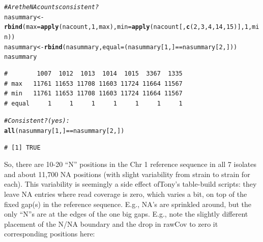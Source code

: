\documentclass{article}\usepackage[]{graphicx}\usepackage[]{color}
\makeatletter
\newcommand{\hlnum}[1]{\textcolor[rgb]{0.686,0.059,0.569}{#1}}%
\newcommand{\hlcom}[1]{\textcolor[rgb]{0.678,0.584,0.686}{\textit{#1}}}%
\newcommand{\hlopt}[1]{\textcolor[rgb]{0,0,0}{#1}}%
\newcommand{\hlstd}[1]{\textcolor[rgb]{0.345,0.345,0.345}{#1}}%
\newcommand{\hlkwb}[1]{\textcolor[rgb]{0.69,0.353,0.396}{#1}}%
\newcommand{\hlkwc}[1]{\textcolor[rgb]{0.333,0.667,0.333}{#1}}%
\newcommand{\hlkwd}[1]{\textcolor[rgb]{0.737,0.353,0.396}{\textbf{#1}}}%
\newenvironment{kframe}{%
 \def\at@end@of@kframe{}%
 \ifinner\ifhmode%
  \def\at@end@of@kframe{\end{minipage}}%
  \begin{minipage}{\columnwidth}%
 \fi\fi%
 \def\FrameCommand##1{\hskip\@totalleftmargin \hskip-\fboxsep
 \colorbox{shadecolor}{##1}\hskip-\fboxsep
     \hskip-\linewidth \hskip-\@totalleftmargin \hskip\columnwidth}%
 \MakeFramed {\advance\hsize-\width
   \@totalleftmargin\z@ \linewidth\hsize
   \@setminipage}}%
 {\par\unskip\endMakeFramed%
 \at@end@of@kframe}
\newenvironment{knitrout}{}{} %
\makeatother
\begin{document}
\begin{knitrout}\footnotesize
{}\color{fgcolor}\begin{kframe}
\begin{alltt}
\hlcom{# Are the NA counts consistent?}
\hlstd{nasummary} \hlkwb{<-} \hlkwd{rbind}\hlstd{(}\hlkwc{max}\hlstd{=}\hlkwd{apply}\hlstd{(nacount,}\hlnum{1}\hlstd{,max),}\hlkwc{min}\hlstd{=}\hlkwd{apply}\hlstd{(nacount[,}\hlkwd{c}\hlstd{(}\hlnum{2}\hlstd{,}\hlnum{3}\hlstd{,}\hlnum{4}\hlstd{,}\hlnum{14}\hlstd{,}\hlnum{15}\hlstd{)],}\hlnum{1}\hlstd{,min))}
\hlstd{nasummary} \hlkwb{<-} \hlkwd{rbind}\hlstd{(nasummary,} \hlkwc{equal}\hlstd{=(nasummary[}\hlnum{1}\hlstd{,]}\hlopt{==}\hlstd{nasummary[}\hlnum{2}\hlstd{,]))}
\hlstd{nasummary}
\end{alltt}
\begin{verbatim}
#        1007  1012  1013  1014  1015  3367  1335
# max   11761 11653 11708 11603 11724 11664 11567
# min   11761 11653 11708 11603 11724 11664 11567
# equal     1     1     1     1     1     1     1
\end{verbatim}
\begin{alltt}
\hlcom{# Consistent? (yes):}
\hlkwd{all}\hlstd{(nasummary[}\hlnum{1}\hlstd{,]}\hlopt{==}\hlstd{nasummary[}\hlnum{2}\hlstd{,])}
\end{alltt}
\begin{verbatim}
# [1] TRUE
\end{verbatim}
\end{kframe}
\end{knitrout}

So, there are 10-20 ``N'' positions in the Chr 1 reference sequence in all 7 isolates and about 11,700 NA positions (with slight variability from strain to strain for each). This variability is seemingly a side effect ofTony's table-build scripts: they leave NA entries where read coverage is zero, which varies a bit, on top of the fixed gap(s) in the reference sequence.  E.g., NA's are sprinkled around, but the only ``N''s are at the edges of the one big gaps.  E.g., note the slightly different placement of the N/NA boundary and the drop in rawCov to zero it corresponding positions here:
\end{document}
